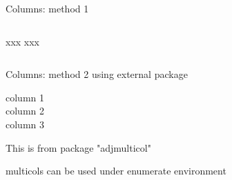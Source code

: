 \documentclass{beamer}
\begin{document}
\begin{frame}{Columns: method 1}
\begin{columns}[onlytextwidth] %
xxx
xxx
\end{columns}
\end{frame}

\begin{frame}{Columns: method 2 using external package}
\begin{multicols}{3}
column 1 \\ column 2 \\ column 3 
\end{multicols}
\begin{enumerate}
\begin{multicols}{2}
\item This is from package "adjmulticol"
\item multicols can be used under enumerate environment
\end{multicols}
\end{enumerate}
\end{frame}
\end{document}
